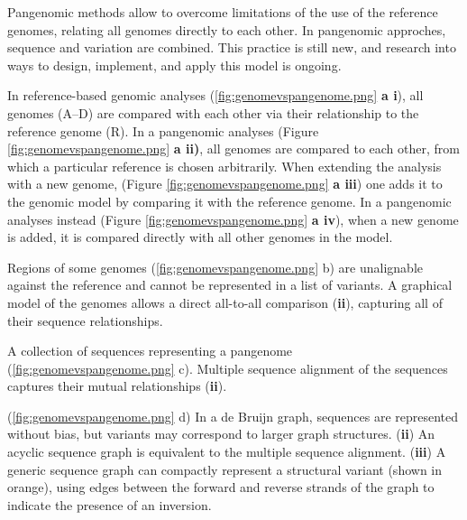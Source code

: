Pangenomic methods allow to overcome limitations of the use of the reference genomes, relating all genomes directly to each other. In pangenomic approches, sequence and variation are combined. This practice is still new, and research into ways to design, implement, and apply this model is ongoing.  \cite{eizenga2020pangenome} 

In reference-based genomic analyses (\ref{fig:genomevspangenome.png} \textbf{a i}), all genomes (A–D) are compared with each other via their relationship to the reference genome (R).
In a pangenomic analyses (Figure \ref{fig:genomevspangenome.png} \textbf{a ii)},  all genomes are compared to each other, from which a particular reference is chosen arbitrarily. 
When extending the analysis with a new genome, (Figure \ref{fig:genomevspangenome.png} \textbf{a iii}) one adds it to the genomic model by comparing it with the reference genome.
In a pangenomic analyses instead (Figure \ref{fig:genomevspangenome.png} \textbf{a iv}), when a new genome is added, it is compared directly with all other genomes in the model.
 
 
Regions of some genomes (\ref{fig:genomevspangenome.png} b) are unalignable against the reference and cannot be represented in a list of variants. A graphical model of the genomes allows a direct all-to-all comparison (\textbf{ii}), capturing all of their sequence relationships.

A collection of sequences representing a pangenome (\ref{fig:genomevspangenome.png} c). Multiple sequence alignment of the sequences captures their mutual relationships (\textbf{ii}).

(\ref{fig:genomevspangenome.png} d) In a de Bruijn graph, sequences are represented without bias, but variants may
correspond to larger graph structures. (\textbf{ii}) An acyclic sequence graph is equivalent to the multiple sequence alignment. (\textbf{iii}) A generic sequence graph can compactly represent a structural variant (shown in orange), using edges between the forward and reverse strands of
the graph to indicate the presence of an inversion.


